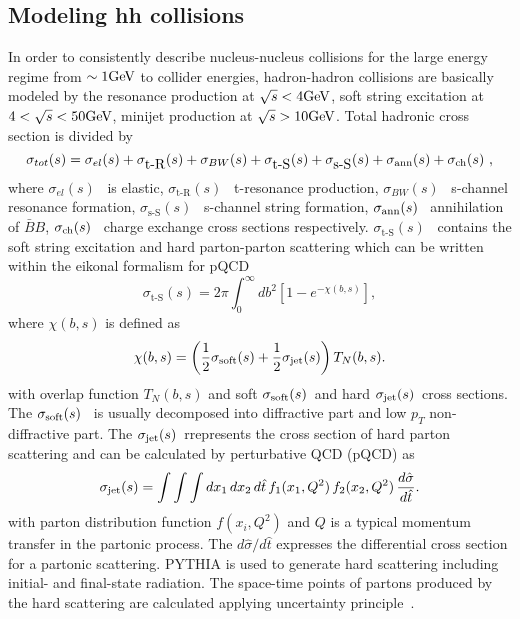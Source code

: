 \documentclass[]{article}
\newcommand{\srt}{\mbox{$\sqrt{s}$}}
\newcommand{\sigel}{\mbox{$\sigma_{el}(s)$}}
\newcommand{\sigtR}{\mbox{$\sigma_{\mbox{t-R}}(s)$}}
\newcommand{\sigtS}{\mbox{$\sigma_{\mbox{t-S}}(s)$}}
\newcommand{\sigbw}{\mbox{$\sigma_{BW}(s)$}}
\newcommand{\sigsS}{\mbox{$\sigma_{\mbox{s-S}}(s)$}}
\newcommand{\sigsoft}{\mbox{$\sigma_{{\rm soft}}(s)$}}
\newcommand{\sigjet}{\mbox{$\sigma_{{\rm jet}}(s)$}}
\newcommand{\sigann}{\mbox{$\sigma_{{\rm ann}}(s)$}}
\newcommand{\sigch}{\mbox{$\sigma_{{\rm ch}}(s)$}}
\newcommand{\Bbar}{\mbox{$\bar B$}}
\def\GeV{\mbox{\rm GeV}}
\begin{document}
\subsection{Modeling hh collisions}

In order to consistently describe nucleus-nucleus collisions
for the large energy regime from $\sim 1\GeV$ to collider energies, 
hadron-hadron collisions are basically modeled by the resonance production at
 $\srt<4\GeV$,
soft string excitation at $4<\srt<50\GeV$,
minijet production at $\srt>10\GeV$.
Total hadronic cross section is divided by
\begin{equation}
  \sigma_{tot}(s)=\sigel+\sigtR+\sigbw+\sigtS+\sigsS+\sigann+\sigch ~,
\end{equation}
where $\sigel$~ is elastic,
      $\sigtR$~ t-resonance production,
      $\sigbw$~ s-channel resonance formation,
      $\sigsS$~ s-channel string formation,
      $\sigann$~ annihilation of $\Bbar B$,
      $\sigch$~ charge exchange cross sections respectively.
$\sigtS$~ contains the soft string excitation and hard parton-parton scattering
which can be written within the eikonal formalism for pQCD~\cite{hijing}
\begin{equation}
\sigtS=2\pi\int^{\infty}_0 db^2\left[1-e^{-\chi(b,s)}\right],
\end{equation}
where $\chi(b,s)$ is defined as
\begin{equation}
  \chi(b,s)=\left({1\over2}\sigsoft+{1\over2}\sigjet\right) T_N(b,s).
\end{equation}
with overlap function $T_N(b,s)$
   and soft \sigsoft\ and hard \sigjet\ cross sections.
The \sigsoft~ is usually decomposed into diffractive part and
  low $p_T$ non-diffractive part.
The \sigjet\ rrepresents the cross section of hard parton scattering
  and can be calculated by perturbative QCD (pQCD) as
  \begin{equation}
    \sigjet  =  \int \int \int d x_1 \, d x_2 \, d \hat{t} \,
     f_1(x_1, Q^2) \, f_2(x_2, Q^2) \, \frac{d \hat{\sigma}}{d \hat{t}}.
  \end{equation}
  with parton distribution function $f(x_i,Q^2)$ and $Q$ is
  a typical momentum transfer in the partonic process.
The $d \hat{\sigma}/d \hat{t}$ expresses the differential
cross section for a partonic scattering.
PYTHIA is used to generate hard scattering including initial- and
final-state radiation.
The space-time points of partons produced by the hard scattering 
 are calculated applying uncertainty principle~\cite{eskola1}.
\end{document}

